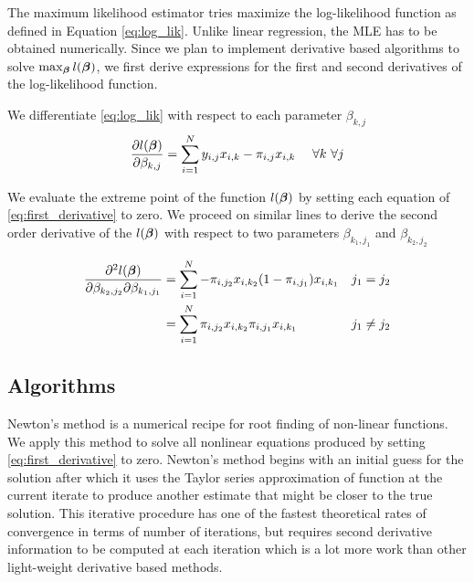 The maximum likelihood estimator tries maximize the log-likelihood function as
defined in Equation \eqref{eq:log_lik}. Unlike linear regression, the MLE has to
be obtained numerically. Since we plan to implement derivative based algorithms
to solve $\max_{\boldsymbol{\beta}} l(\boldsymbol{\beta})$, we first derive expressions for the
first and second derivatives of the log-likelihood function.

We differentiate \eqref{eq:log_lik} with respect to each parameter $\beta_{k,j}$
\begin{equation}\label{eq:first_derivative}
\frac{\partial l(\boldsymbol{\beta})}{\partial \beta_{k,j}} = \sum_{i=1}^{N} y_{i,j}x_{i,k} - \pi_{i,j}x_{i,k} \ \ \ \ \forall k \  \forall j
\end{equation}

We  evaluate the extreme point of the function $l(\boldsymbol{\beta})$ by setting each
equation of \eqref{eq:first_derivative} to zero. We proceed on similar lines to
derive the second order derivative of the $l(\boldsymbol{\beta})$ with respect to  two
parameters $\beta_{k_1,j_1}$ and $\beta_{k_2,j_2}$

\begin{subequations}
\begin{align}\label{eq:second_derivative}
\frac{\partial^2 l(\boldsymbol{\beta})}{\partial \beta_{k_2,j_2} \partial \beta_{k_1,j_1}}
&= \sum_{i=1}^{N} -\pi_{i,j_2}x_{i,k_2}(1-\pi_{i,j_1})x_{i,k_1} &&j_1 = j_2 \\
&= \sum_{i=1}^{N} \pi_{i,j_2}x_{i,k_2}\pi_{i,j_1}x_{i,k_1} &&j_1 \neq j_2
\end{align}
\end{subequations}

\subsection{Algorithms}

Newton's method is a numerical recipe for root finding of non-linear functions.
We apply this method to solve all nonlinear equations produced by setting
\eqref{eq:first_derivative} to zero. Newton's method begins with an initial
guess  for the solution after which it uses the Taylor series approximation of
function at the current iterate to produce another estimate that might be closer
to the true solution. This iterative procedure has one of the fastest
theoretical rates of convergence in terms of number of iterations, but requires
second derivative information to be computed at each iteration which is a lot
more work than other light-weight derivative based methods.

